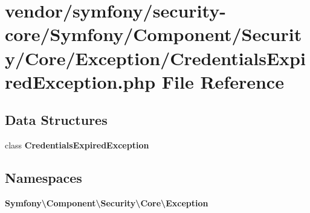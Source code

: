 \section{vendor/symfony/security-\/core/\+Symfony/\+Component/\+Security/\+Core/\+Exception/\+Credentials\+Expired\+Exception.php File Reference}
\label{_credentials_expired_exception_8php}
\subsection*{Data Structures}
\begin{DoxyCompactItemize}
\item 
class {\bf Credentials\+Expired\+Exception}
\end{DoxyCompactItemize}
\subsection*{Namespaces}
\begin{DoxyCompactItemize}
\item 
 {\bf Symfony\textbackslash{}\+Component\textbackslash{}\+Security\textbackslash{}\+Core\textbackslash{}\+Exception}
\end{DoxyCompactItemize}
